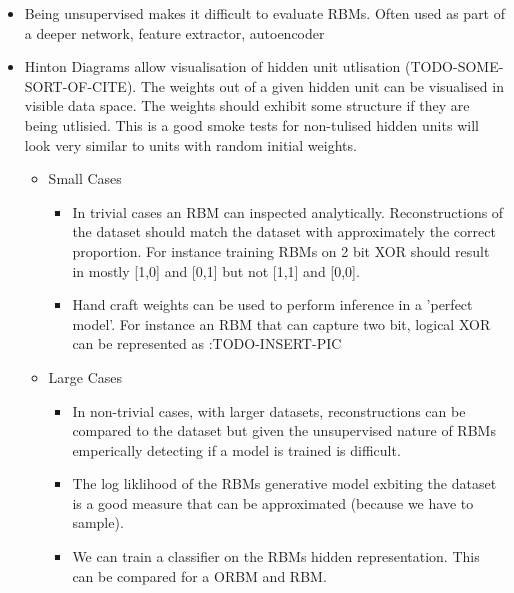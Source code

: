   \begin{itemize}
    \item Being unsupervised makes it difficult to evaluate RBMs. Often used as part of a deeper network, feature extractor, autoencoder
    \item Hinton Diagrams allow visualisation of hidden unit utlisation (TODO-SOME-SORT-OF-CITE). The weights out of a given hidden unit can be visualised in visible data space. The weights should exhibit some structure if they are being utlisied. This is a good smoke tests for non-tulised hidden units will look very similar to units with random initial weights.
    \begin{itemize}
      \item Small Cases
      \begin{itemize}
        \item In trivial cases an RBM can inspected analytically. Reconstructions of the dataset should match the dataset with approximately the correct proportion. For instance training RBMs on 2 bit XOR should result in mostly [1,0] and [0,1] but not [1,1] and [0,0].
        \item Hand craft weights can be used to perform inference in a 'perfect model'. For instance an RBM that can capture two bit, logical XOR can be represented as :TODO-INSERT-PIC
      \end{itemize}
      \item Large Cases
      \begin{itemize}
        \item In non-trivial cases, with larger datasets, reconstructions can be compared to the dataset but given the unsupervised nature of RBMs emperically detecting if a model is trained is difficult.
        \item The log liklihood of the RBMs generative model exbiting the dataset is a good measure that can be approximated (because we have to sample).
        \item We can train a classifier on the RBMs hidden representation. This can be compared for a ORBM and RBM.
      \end{itemize}
    \end{itemize}
  \end{itemize}

